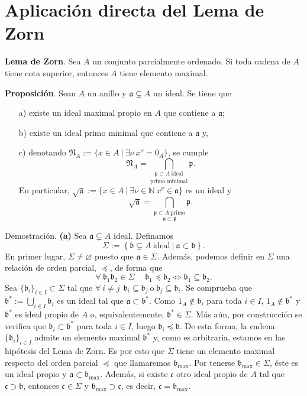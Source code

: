 \documentclass[a4paper,12pt]{article}
\newcommand{\N}{\mathbb{N}}
\newcommand{\p}{\mathfrak{p}}
\newcommand{\af}{\mathfrak{a}}
\newcommand{\bfr}{\mathfrak{b}}
\newcommand{\cf}{\mathfrak{c}}
\newcommand{\Nf}{\mathfrak{N}}
\begin{document}
\section{Aplicación directa del Lema de Zorn}
\textbf{Lema de Zorn}. Sea $A$ un conjunto parcialmente ordenado. Si toda cadena de $A$ tiene cota superior, entonces $A$ tiene elemento maximal.

\textbf{Proposición}. Sean $A$ un anillo y $\af\subsetneq A$ un ideal. Se tiene que\begin{itemize}
    \item[a)] existe un ideal maximal propio en $A$ que contiene a $\af$;
    \item[b)] existe un ideal primo minimal que contiene a $\af$ y,
    \item[c)] denotando $\Nf_A:=\{x\in A\ |\ \exists\nu\ x^{\nu}=0_A\}$, se cumple$$\Nf_A=\underset{\text{primo minimal}}{\bigcap_{\p\subset A\ \text{ideal}}}\p.$$En particular, $\sqrt{\af}:=\{x\in A\ |\ \exists\nu\in\N\ x^\nu\in\af\}$ es un ideal y$$\sqrt{\af}=\underset{\af\subset\p}{\bigcap_{\p\subset A\ \text{primo}}}\p.$$
\end{itemize}
Demostración. \textbf{(a)} Sea $\af\subsetneq A$ ideal. Definamos$$\Sigma:=\left\{\bfr\subsetneq A\ \text{ideal}\ |\ \af\subset\bfr \right\}.$$
En primer lugar, $\Sigma\neq\varnothing$ puesto que $\af\in\Sigma$. Además, podemos definir en $\Sigma$ una relación de orden parcial, $\preceq$, de forma que$$\forall\ \bfr_1\bfr_2\in\Sigma\hspace{15pt}\bfr_1\preceq\bfr_2\Leftrightarrow\bfr_1\subseteq\bfr_2.$$
Sea $\{\bfr_i\}_{i\in I}\subset\Sigma$ tal que $\forall\ i\neq j\hspace{5pt}\bfr_i\subseteq\bfr_j\ \text{o}\ \bfr_j\subseteq\bfr_i$. Se comprueba que $\bfr^*:=\bigcup_{i\in I}\bfr_i$ es un ideal tal que $\af\subset\bfr^*$.
Como $1_A\notin\bfr_i$ para toda $i\in I$, $1_A\notin\bfr^*$ y $\bfr^*$ es ideal propio de $A$ o, equivalentemente, $\bfr^*\in\Sigma$. Más aún, por construcción se verifica que $\bfr_i\subset\bfr^*$ para toda $i\in I$, luego $\bfr_i\preceq\bfr$.
De esta forma, la cadena $\{\bfr_i\}_{i\in I}$ admite un elemento maximal $\bfr^*$ y, como es arbitraria, estamos en las hipótesis del Lema de Zorn.
Es por esto que $\Sigma$ tiene un elemento maximal respecto del orden parcial $\preceq$ que llamaremos $\bfr_{\max}$.
Por tenerse $\bfr_{\max}\in\Sigma$, éste es un ideal propio y $\af\subset\bfr_{\max}$. Además, si existe $\cf$ otro ideal propio de $A$ tal que $\cf\supset\bfr$, entonces $\cf\in\Sigma$ y $\bfr_{\max}\supset\cf$, es decir, $\cf=\bfr_{\max}$.
\end{document}
